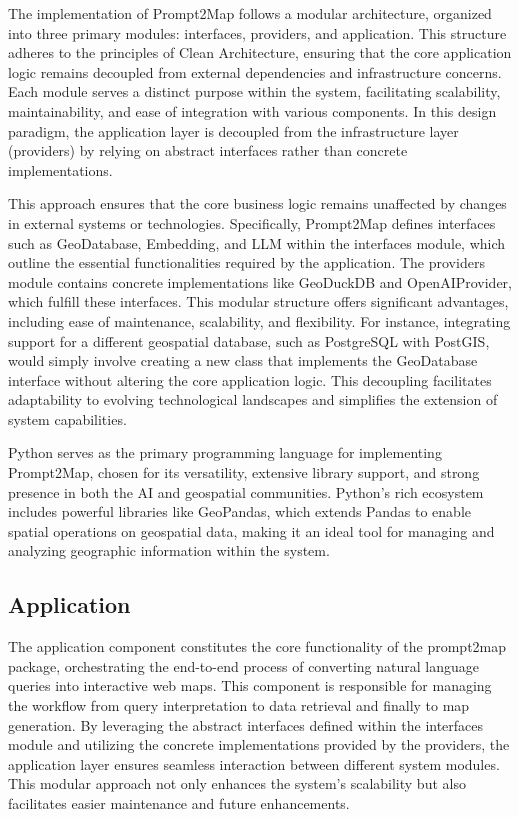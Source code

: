 
The implementation of Prompt2Map follows a modular architecture, organized into three primary modules: interfaces, providers, and application. This structure adheres to the principles of Clean Architecture, ensuring that the core application logic remains decoupled from external dependencies and infrastructure concerns. Each module serves a distinct purpose within the system, facilitating scalability, maintainability, and ease of integration with various components. In this design paradigm, the application layer is decoupled from the infrastructure layer (providers) by relying on abstract interfaces rather than concrete implementations. 

This approach ensures that the core business logic remains unaffected by changes in external systems or technologies. Specifically, Prompt2Map defines interfaces such as GeoDatabase, Embedding, and LLM within the interfaces module, which outline the essential functionalities required by the application. The providers module contains concrete implementations like GeoDuckDB and OpenAIProvider, which fulfill these interfaces. This modular structure offers significant advantages, including ease of maintenance, scalability, and flexibility. For instance, integrating support for a different geospatial database, such as PostgreSQL with PostGIS, would simply involve creating a new class that implements the GeoDatabase interface without altering the core application logic. This decoupling facilitates adaptability to evolving technological landscapes and simplifies the extension of system capabilities.

Python serves as the primary programming language for implementing Prompt2Map, chosen for its versatility, extensive library support, and strong presence in both the AI and geospatial communities. Python's rich ecosystem includes powerful libraries like GeoPandas, which extends Pandas to enable spatial operations on geospatial data, making it an ideal tool for managing and analyzing geographic information within the system.

\subsection{Application}
The application component constitutes the core functionality of the prompt2map package, orchestrating the end-to-end process of converting natural language queries into interactive web maps. This component is responsible for managing the workflow from query interpretation to data retrieval and finally to map generation. By leveraging the abstract interfaces defined within the interfaces module and utilizing the concrete implementations provided by the providers, the application layer ensures seamless interaction between different system modules. This modular approach not only enhances the system's scalability but also facilitates easier maintenance and future enhancements.

